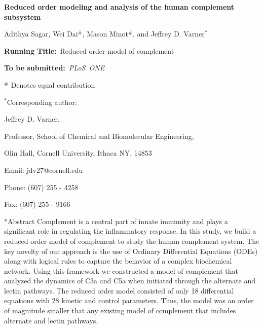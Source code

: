 \documentclass[12pt]{article}
\makeatletter
\renewcommand\section{\@startsection
	{subsection}{2}{0mm}
	{-0.2in}
	{0.05\baselineskip}
	{\normalfont\large\bfseries}}
\makeatother
\begin{document}
\begin{titlepage}
{\par\centering\textbf{\Large {Reduced order modeling and analysis of the human complement subsystem}}}
\vspace{0.05in}
{\par \centering \large{Adithya Sagar, Wei Dai$^{\#}$, Mason Minot$^{\#}$, and Jeffrey D. Varner$^{*}$}}
\vspace{0.10in}
{\par {}}
{\par {}}
\vspace{0.1in}
{\par \centering \textbf{Running Title:}~Reduced order model of complement}
\vspace{0.1in}
{\par \centering \textbf{To be submitted:}~\emph{PLoS~ONE}}
\vspace{0.5in}
{\par \centering $^{\#}$ Denotes equal contribution}
\vspace{0.1in}
{\par \centering $^{*}$Corresponding author:}
{\par \centering Jeffrey D. Varner,}
{\par \centering Professor, School of Chemical and Biomolecular Engineering,}
{\par {} Olin Hall, Cornell University, Ithaca NY, 14853}
{\par \centering Email: jdv27@cornell.edu}
{\par \centering Phone: (607) 255 - 4258}
{\par \centering Fax: (607) 255 - 9166}
\end{titlepage}
\date{}
\thispagestyle{empty}
\pagebreak
\section*{Abstract}
Complement is a central part of innate immunity and plays a significant role in regulating the inflammatory response. In this study, we build a reduced order model of complement to study the human complement system.
The key novelty of our approach is the use of Ordinary Differential Equations (ODEs) along with logical rules to capture the behavior of a complex biochemical network.  Using this framework we constructed a model of complement that analyzed the dynamics of C3a and C5a when initiated through the alternate and lectin pathways. The reduced order model consisted of only 18 differential equations with 28 kinetic and control parameters. Thus, the model was an order of magnitude smaller that any existing model of complement that includes alternate and lectin pathways. 
\end{document}
